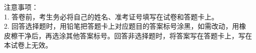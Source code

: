 \hspace{3cm}\\
\vspace{0.5cm}
\\
\\
\vspace{0.4cm}
\\
\\
\begin{flushleft}
  \wuhao 注意事项：\\
  1. 答卷前，考生务必将自己的姓名、准考证号填写在试卷和答题卡上。\\
  2. 回答选择题时，用铅笔把答题卡上对应题目的答案标号涂黑，如需改动，用橡皮檫干净后，再选涂其他答案标号。回答非选择题时，将答案写在答题卡上，写在本试卷上无效。
\end{flushleft}
\vspace{-1.6em}
